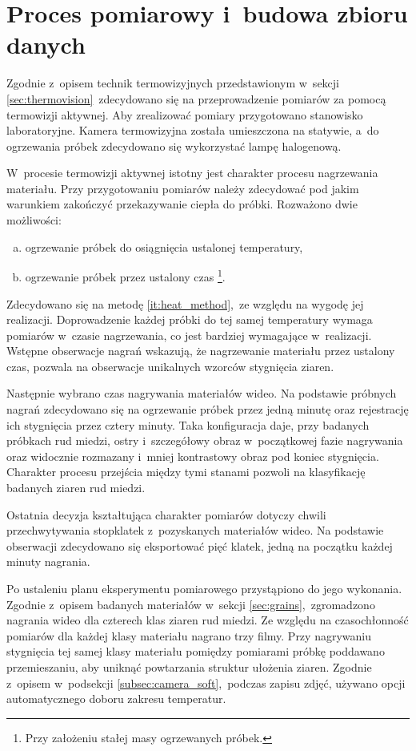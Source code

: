 \section{Proces pomiarowy i~budowa zbioru danych}
\label{sec:measure}
Zgodnie z~opisem technik termowizyjnych przedstawionym w~sekcji
\ref{sec:thermovision}~zdecydowano się na przeprowadzenie pomiarów za pomocą
termowizji aktywnej.
Aby zrealizować pomiary przygotowano stanowisko laboratoryjne.
Kamera termowizyjna została umieszczona na statywie, a~do ogrzewania próbek
zdecydowano się wykorzystać lampę halogenową.

W~procesie termowizji aktywnej istotny jest charakter procesu nagrzewania
materiału.
Przy przygotowaniu pomiarów należy zdecydować pod jakim warunkiem zakończyć
przekazywanie ciepła do próbki.
Rozważono dwie możliwości:
\begin{enumerate}[a)]
    \item ogrzewanie próbek do osiągnięcia ustalonej temperatury,
    \item \label{it:heat_method}
          ogrzewanie próbek przez ustalony czas%
          \footnote{%
              Przy założeniu stałej masy ogrzewanych próbek.
          }.
\end{enumerate}
Zdecydowano się na metodę \ref{it:heat_method},~ze względu na wygodę jej
realizacji.
Doprowadzenie każdej próbki do tej samej temperatury wymaga pomiarów w~czasie
nagrzewania, co jest bardziej wymagające w~realizacji.
Wstępne obserwacje nagrań wskazują, że nagrzewanie materiału przez ustalony
czas, pozwala na obserwacje unikalnych wzorców stygnięcia ziaren.

Następnie wybrano czas nagrywania materiałów wideo.
Na podstawie próbnych nagrań zdecydowano się na ogrzewanie próbek przez jedną
minutę oraz rejestrację ich stygnięcia przez cztery minuty.
Taka konfiguracja daje, przy badanych próbkach rud miedzi, ostry i~szczegółowy
obraz w~początkowej fazie nagrywania oraz widocznie rozmazany i~mniej
kontrastowy obraz pod koniec stygnięcia.
Charakter procesu przejścia między tymi stanami pozwoli na klasyfikację badanych
ziaren rud miedzi.

Ostatnia decyzja kształtująca charakter pomiarów dotyczy chwili przechwytywania
stopklatek z~pozyskanych materiałów wideo.
Na podstawie obserwacji zdecydowano się eksportować pięć klatek, jedną na
początku każdej minuty nagrania.

Po ustaleniu planu eksperymentu pomiarowego przystąpiono do jego wykonania.
Zgodnie z~opisem badanych materiałów w~sekcji \ref{sec:grains},~zgromadzono
nagrania wideo dla czterech klas ziaren rud miedzi.
Ze względu na czasochłonność pomiarów dla każdej klasy materiału nagrano trzy
filmy.
Przy nagrywaniu stygnięcia tej samej klasy materiału pomiędzy pomiarami próbkę
poddawano przemieszaniu, aby uniknąć powtarzania struktur ułożenia ziaren.
Zgodnie z~opisem w~podsekcji \ref{subsec:camera_soft},~podczas zapisu zdjęć,
używano opcji automatycznego doboru zakresu temperatur.

